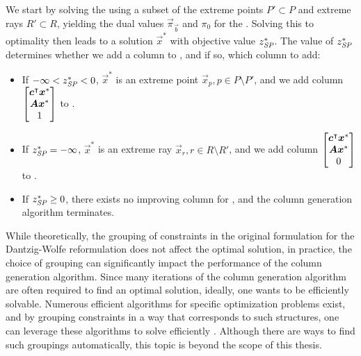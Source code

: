 We start by solving the \RMP{} using a subset of the extreme points $P' \subset P$ and extreme rays $R' \subset R$, yielding the dual values $\vec{\pi}_\vec{b}$ and $\pi_0$ for the \SP{}. Solving this \SP{} to optimality then leads to a solution $\vec{x}^*$ with objective value $z^*_\SP{}$. The value of $z^*_\SP{}$ determines whether we add a column to \RMP{}, and if so, which column to add:
\begin{itemize}
\item If $-\infty < z^*_\SP{} < 0$, $\vec{x}^*$ is an extreme point $\vec{x}_p, p \in P \setminus P'$, and we add column $\begin{bmatrix} {\bm{c}}^\intercal {\bm{x}}^* \\ {\bm{A}} {\bm{x}}^* \\ 1 \end{bmatrix}$ to \RMP{}.
\item If $z^*_\SP{} = -\infty$, $\vec{x}^*$ is an extreme ray $\vec{x}_r, r \in R \setminus R'$, and we add column $\begin{bmatrix} {\bm{c}}^\intercal {\bm{x}}^* \\ {\bm{A}} {\bm{x}}^* \\ 0 \end{bmatrix}$ to \RMP{}.
\item If $z^*_\SP{} \geq 0$, there exists no improving column for \RMP{}, and the column generation algorithm terminates.
\end{itemize}

While theoretically, the grouping of constraints in the original \LP{} formulation for the Dantzig-Wolfe reformulation does not affect the optimal solution, in practice, the choice of grouping can significantly impact the performance of the column generation algorithm. Since many iterations of the column generation algorithm are often required to find an optimal solution, ideally, one wants \SP{} to be efficiently solvable. Numerous efficient algorithms for specific optimization problems exist, and by grouping constraints in a way that \SP{} corresponds to such structures, one can leverage these algorithms to solve \SP{} efficiently \cite{thebook}. Although there are ways to find such groupings automatically, this topic is beyond the scope of this thesis.
